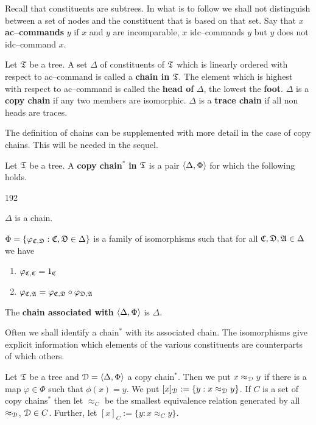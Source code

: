 Recall that constituents are subtrees. In what is to follow we
shall not distinguish between a set of nodes and the constituent
that is based on that set. Say that $x$ \textbf{ac--commands} 
$y$ if $x$  and $y$ are incomparable, $x$ idc--commands $y$ but $y$ 
does not idc--command $x$.
\begin{defn}
Let $\mathfrak{T}$ be a tree. A set $\Delta$ of constituents of $\mathfrak{T}$ which 
is linearly ordered with respect to ac--command is called a 
\textbf{chain in} $\mathfrak{T}$. The element which is highest with respect 
to ac--command is called the \textbf{head of} $\Delta$, the lowest 
the \textbf{foot}. $\Delta$ is a \textbf{copy chain} if any two 
members are isomorphic. $\Delta$ is a \textbf{trace chain} if all 
non heads are traces.
\end{defn}
The definition of chains can be supplemented with more detail
in the case of copy chains. This will be needed in the sequel.
\begin{defn}
Let $\mathfrak{T}$ be a tree. A \textbf{copy chain}$^{\ast}$ \textbf{in} $\mathfrak{T}$
is a pair $\langle \Delta, \Phi\rangle$ for which the following holds.
\begin{dingautolist}{192}
\item
$\Delta$ is a chain.
\item
$\Phi = \{\varphi_{\mathfrak{C},\mathfrak{D}} : \mathfrak{C}, \mathfrak{D} \in \Delta\}$ is a family of
isomorphisms such that for all $\mathfrak{C}, \mathfrak{D}, \mathfrak{A} \in \Delta$ we have
\begin{enumerate}
\item $\varphi_{\mathfrak{C},\mathfrak{C}} = 1_{\mathfrak{C}}$
\item $\varphi_{\mathfrak{C},\mathfrak{A}} = \varphi_{\mathfrak{C},\mathfrak{D}} \circ \varphi_{\mathfrak{D},\mathfrak{A}}$
\end{enumerate}
\end{dingautolist}
The \textbf{chain associated with} $\langle \Delta, \Phi\rangle$ is $\Delta$.
\end{defn}
Often we shall identify a chain$^{\ast}$ with its associated chain.
The isomorphisms give explicit information which elements
of the various constituents are counterparts of which others.
\begin{defn}
Let $\mathfrak{T}$ be a tree and $\mathcal{D} = \langle \Delta, \Phi\rangle$ a copy
chain$^{\ast}$. Then we put $x \approx_{\mathcal{D}} y$ if there is a map
$\varphi \in \Phi$ such that $\phi(x) = y$.  We put
$[x]_{\mathcal{D}} := \{y : x \approx_{\mathcal{D}} y\}$. If $C$ is a set
of copy chains$^{\ast}$ then let $\approx_C$ be the smallest equivalence
relation generated by all $\approx_{\mathcal{D}}$, $\mathcal{D} \in C$.
Further, let $[x]_C := \{y : x \approx_C y\}$.
\end{defn}
